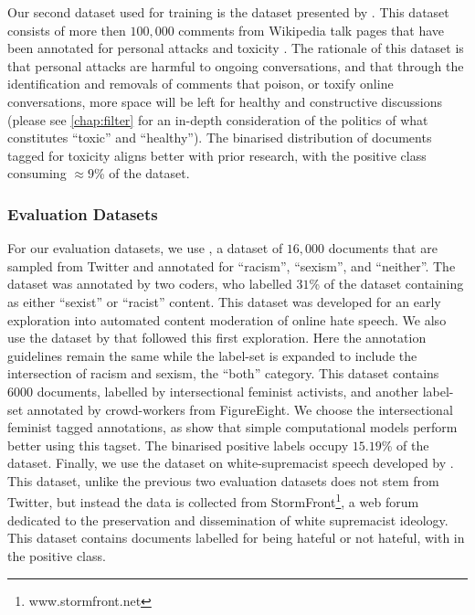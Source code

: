 Our second dataset used for training is the dataset presented by \citet{Wulczyn:2016}. This dataset consists of more then $100,000$ comments from Wikipedia talk pages that have been annotated for personal attacks and toxicity \cite{Wulczyn:2016}. The rationale of this dataset is that personal attacks are harmful to ongoing conversations, and that through the identification and removals of comments that poison, or toxify online conversations, more space will be left for healthy and constructive discussions (please see \autoref{chap:filter} for an in-depth consideration of the politics of what constitutes ``toxic'' and ``healthy''). The binarised distribution of documents tagged for toxicity aligns better with prior research, with the positive class consuming $\approx 9$\% of the dataset.

\subsubsection{Evaluation Datasets}
For our evaluation datasets, we use \citet{Waseem-Hovy:2016}, a dataset of $16,000$ documents that are sampled from Twitter and annotated for ``racism'', ``sexism'', and ``neither''. The dataset was annotated by two coders, who labelled $31$\% of the dataset containing as either ``sexist'' or ``racist'' content. This dataset was developed for an early exploration into automated content moderation of online hate speech. We also use the dataset by \citet{Waseem:2016} that followed this first exploration. Here the annotation guidelines remain the same while the label-set is expanded to include the intersection of racism and sexism, the ``both'' category. This dataset contains $6000$ documents, labelled by intersectional feminist activists, and another label-set annotated by crowd-workers from FigureEight. We choose the intersectional feminist tagged annotations, as \citet{Waseem:2016} show that simple computational models perform better using this tagset. The binarised positive labels occupy $15.19$\% of the dataset. Finally, we use the dataset on white-supremacist speech developed by \citet{Garcia:2019}. This dataset, unlike the previous two evaluation datasets does not stem from Twitter, but instead the data is collected from StormFront\footnote{www.stormfront.net}, a web forum dedicated to the preservation and dissemination of white supremacist ideology. This dataset contains  documents labelled for being hateful or not hateful, with  in the positive class.

